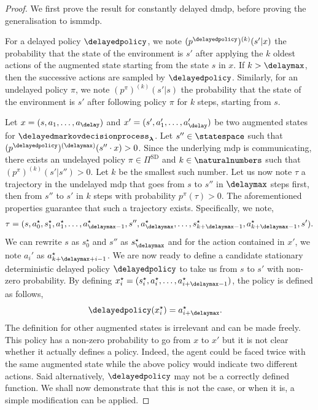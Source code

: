 \begin{proof}
    We first prove the result for constantly delayed \gls{dmdp}, before proving the generalisation to \gls{ismmdp}.
    
    For a delayed policy $\delayedpolicy$, we note $(p^\delayedpolicy)^{(k)}(s'\vert x)$ the probability that the state of the environment is $s'$ after applying the $k$ oldest actions of the augmented state starting from the state $s$ in $x$.
    If $k>\delaymax$, then the successive actions are sampled by $\delayedpolicy$. 
    Similarly, for an undelayed policy $\pi$,  we note $(p^\pi)^{(k)}(s'\vert s)$ the probability that the state of the environment is $s'$ after following policy $\pi$ for $k$ steps, starting from $s$.
    
    Let $x=(s,a_1,\dots,a_\delay)$ and $x'=(s',a_1',\dots,a_\delay')$ be two augmented states for $\delayedmarkovdecisionprocess_{\boldsymbol\lambda}$.
    Let $s''\in\statespace$ such that $(p^\delayedpolicy)^{(\delaymax)}(s''\cdot x)>0$. 
    Since the underlying \gls{mdp} is communicating, there exists an undelayed policy $\pi\in\Pi^{\text{SD}}$ and $k\in\naturalnumbers$ such that $(p^\pi)^{(k)}(s'\vert s'')>0$. 
    Let $k$ be the smallest such number.  
    Let us now note $\tau$ a trajectory in the undelayed \gls{mdp} that goes from $s$ to $s''$ in $\delaymax$ steps first, then from $s''$ to $s'$ in $k$ steps with probability $p^\pi(\tau)>0$. 
    The aforementioned properties guarantee that such a trajectory exists. 
    Specifically, we note,
    \begin{align*}
        \tau=(s,a_0^\star,s_1^\star,a_1^\star,\dots,a_{\delaymax-1}^\star,s'',a_{\delaymax}^\star,\dots,s_{k+\delaymax-1}^\star,a_{k+\delaymax-1}^\star,s').
    \end{align*}
    We can rewrite $s$ as $s_0^\star$ and $s''$ as $s_{\delaymax}^\star$ and for the action contained in $x'$, we note $a_i'$ as $a_{k+\delaymax+i-1}^\star$. 
    We are now ready to define a candidate stationary deterministic delayed policy $\delayedpolicy$ to take us from $s$ to $s'$ with non-zero probability. 
    By defining $x_i^\star=(s_i^\star,a_i^\star,\dots,a_{i+\delaymax-1}^\star)$, the policy is defined as follows,
    \begin{align*}
        &\delayedpolicy(x_i^\star) = a_{i+\delaymax}^\star.
    \end{align*}
    The definition for other augmented states is irrelevant and can be made freely.
    This policy has a non-zero probability to go from $x$ to $x'$ but it is not clear whether it actually defines a policy.
    Indeed, the agent could be faced twice with the same augmented state while the above policy would indicate two different actions. 
    Said alternatively, $\delayedpolicy$ may not be a correctly defined function. 
    We shall now demonstrate that this is not the case, or when it is, a simple modification can be applied. 
    

\end{proof}
